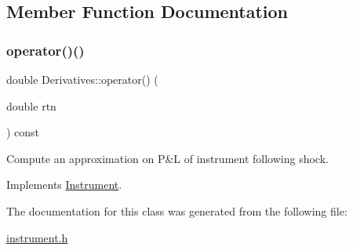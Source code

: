 \subsection{Member Function Documentation}
\hypertarget{classDerivatives_a765ecae139ee81fb5143a20462211623}{}\label{classDerivatives_a765ecae139ee81fb5143a20462211623} 
\subsubsection{\texorpdfstring{operator()()}{operator()()}}
{\footnotesize\ttfamily double Derivatives\+::operator() (\begin{DoxyParamCaption}\item[{double}]{rtn }\end{DoxyParamCaption}) const\hspace{0.3cm}{\ttfamily [virtual]}}



Compute an approximation on P\&L of instrument following shock. 



Implements \hyperlink{classInstrument_a33b6faccaeb494858dee5c547de897b6}{Instrument}.



The documentation for this class was generated from the following file\+:\begin{DoxyCompactItemize}
\item 
\hyperlink{instrument_8h}{instrument.\+h}\end{DoxyCompactItemize}
